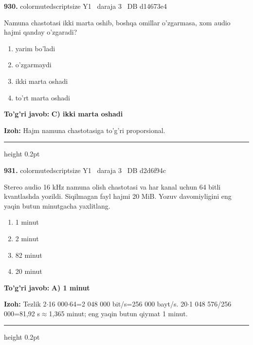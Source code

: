 \documentclass[10pt,a4paper,oneside]{article}
\begin{document}
\noindent\textbf{\color{ink}930.}  {color{muted}scriptsize Y1 \textbullet\ daraja 3 \textbullet\ DB d14673e4}
\par
Namuna chastotasi ikki marta oshib, boshqa omillar o'zgarmasa, xom audio hajmi qanday o'zgaradi?
\begin{enumerate}[label=\Alph*),leftmargin=9mm]
\item yarim bo'ladi
\item o'zgarmaydi
\item ikki marta oshadi
\item to'rt marta oshadi
\end{enumerate}
\begin{tcolorbox}[enhanced,breakable,colback=teal!4,colframe=teal!50!black,boxrule=0.5pt,arc=1.1mm,left=3mm,right=3mm,top=1.7mm,bottom=1.7mm,before skip=2mm,after skip=2mm]
\textbf{\color{teal}To'g'ri javob:} \textbf{C) ikki marta oshadi}
\par\smallskip
\textbf{Izoh:} Hajm namuna chastotasiga to'g'ri proporsional.
\end{tcolorbox}
\vspace{2mm}\hrule height 0.2pt \vspace{3mm}

\noindent\textbf{\color{ink}931.}  {color{muted}scriptsize Y1 \textbullet\ daraja 3 \textbullet\ DB d2d6f94c}
\par
Stereo audio 16 kHz namuna olish chastotasi va har kanal uchun 64 bitli kvantlashda yozildi. Siqilmagan fayl hajmi 20 MiB. Yozuv davomiyligini eng yaqin butun minutgacha yaxlitlang.
\begin{enumerate}[label=\Alph*),leftmargin=9mm]
\item 1 minut
\item 2 minut
\item 82 minut
\item 20 minut
\end{enumerate}
\begin{tcolorbox}[enhanced,breakable,colback=teal!4,colframe=teal!50!black,boxrule=0.5pt,arc=1.1mm,left=3mm,right=3mm,top=1.7mm,bottom=1.7mm,before skip=2mm,after skip=2mm]
\textbf{\color{teal}To'g'ri javob:} \textbf{A) 1 minut}
\par\smallskip
\textbf{Izoh:} Tezlik 2\ensuremath{\cdot}16 000\ensuremath{\cdot}64=2 048 000 bit/s=256 000 bayt/s. 20\ensuremath{\cdot}1 048 576/256 000=81,92 s\ensuremath{\approx}1,365 minut; eng yaqin butun qiymat 1 minut.
\end{tcolorbox}
\vspace{2mm}\hrule height 0.2pt \vspace{3mm}
\end{document}
